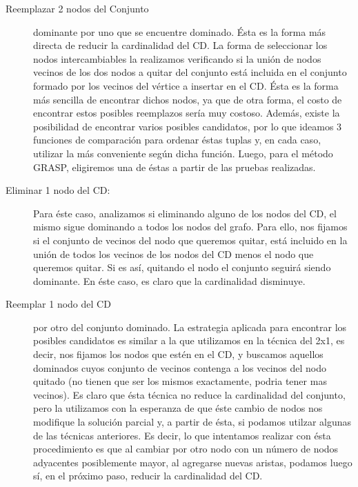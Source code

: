 \begin{description}
\item[Reemplazar 2 nodos del Conjunto] dominante por uno que se encuentre dominado. Ésta es la forma más directa de reducir la cardinalidad del CD. La forma de seleccionar los nodos intercambiables la realizamos verificando si la unión de nodos vecinos de los dos nodos a quitar del conjunto está incluida en el conjunto formado por los vecinos del vértice a insertar en el CD. Ésta es la forma más sencilla de encontrar dichos nodos, ya que de otra forma, el costo de encontrar estos posibles reemplazos sería muy costoso. Además, existe la posibilidad de encontrar varios posibles candidatos, por lo que ideamos 3 funciones de comparación para ordenar éstas tuplas y, en cada caso, utilizar la más conveniente según dicha función. Luego, para el método GRASP, eligiremos una de éstas a partir de las pruebas realizadas.
\item[Eliminar 1 nodo del CD:] Para éste caso, analizamos si eliminando alguno de los nodos del CD, el mismo sigue dominando a todos los nodos del grafo. Para ello, nos fijamos si el conjunto de vecinos del nodo que queremos quitar, está incluido en la unión de todos los vecinos de los nodos del CD menos el nodo que queremos quitar. Si es así, quitando el nodo el conjunto seguirá siendo dominante. En éste caso, es claro que la cardinalidad disminuye.
\item[Reemplar 1 nodo del CD] por otro del conjunto dominado. La estrategia aplicada para encontrar los posibles candidatos es similar a la que utilizamos en la técnica del 2x1, es decir, nos fijamos los nodos que estén en el CD, y buscamos aquellos dominados cuyos conjunto de vecinos contenga a los vecinos del nodo quitado (no tienen que ser los mismos exactamente, podria tener mas vecinos). Es claro que ésta técnica no reduce la cardinalidad del conjunto, pero la utilizamos con la esperanza de que éste cambio de nodos nos modifique la solución parcial y, a partir de ésta, si podamos utilzar algunas de las técnicas anteriores. Es decir, lo que intentamos realizar con ésta procedimiento es que al cambiar por otro nodo con un número de nodos adyacentes posiblemente mayor, al agregarse nuevas aristas, podamos luego sí, en el próximo paso, reducir la cardinalidad del CD.
\end{description}

